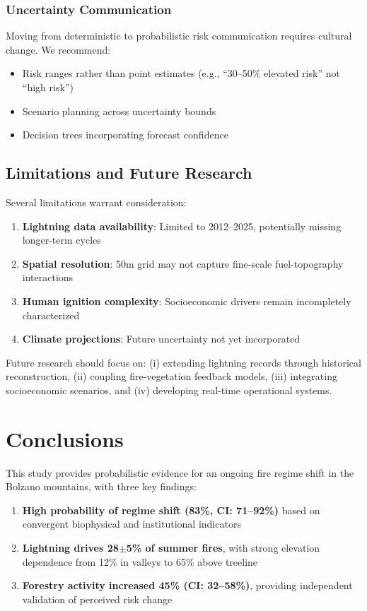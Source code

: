 \documentclass[11pt,a4paper]{article}
\begin{document}
\subsubsection{Uncertainty Communication}
Moving from deterministic to probabilistic risk communication requires cultural change. We recommend:
\begin{itemize}
    \item Risk ranges rather than point estimates (e.g., ``30--50\% elevated risk'' not ``high risk'')
    \item Scenario planning across uncertainty bounds
    \item Decision trees incorporating forecast confidence
\end{itemize}

\subsection{Limitations and Future Research}

Several limitations warrant consideration:
\begin{enumerate}
    \item \textbf{Lightning data availability}: Limited to 2012--2025, potentially missing longer-term cycles
    \item \textbf{Spatial resolution}: 50m grid may not capture fine-scale fuel-topography interactions
    \item \textbf{Human ignition complexity}: Socioeconomic drivers remain incompletely characterized
    \item \textbf{Climate projections}: Future uncertainty not yet incorporated
\end{enumerate}

Future research should focus on: (i) extending lightning records through historical reconstruction, (ii) coupling fire-vegetation feedback models, (iii) integrating socioeconomic scenarios, and (iv) developing real-time operational systems.

\section{Conclusions}

This study provides probabilistic evidence for an ongoing fire regime shift in the Bolzano mountains, with three key findings:

\begin{enumerate}
    \item \textbf{High probability of regime shift (83\%, CI: 71--92\%)} based on convergent biophysical and institutional indicators
    \item \textbf{Lightning drives 28$\pm$5\% of summer fires}, with strong elevation dependence from 12\% in valleys to 65\% above treeline
    \item \textbf{Forestry activity increased 45\% (CI: 32--58\%)}, providing independent validation of perceived risk change
\end{enumerate}
\end{document}
